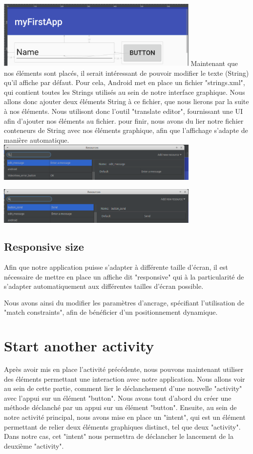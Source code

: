 \documentclass[french,a4paper,12pt]{report}
\begin{document}
\includegraphics[width=10cm]{16.png}
\bigbreak
Maintenant que nos éléments sont placés, il serait intéressant de pouvoir modifier
le texte (String) qu'il affiche par défaut. Pour cela, Android met en place un
fichier "strings.xml", qui contient toutes les Strings utilisés au sein de notre
interface graphique. Nous allons donc ajouter deux éléments String à ce fichier,
que nous lierons par la suite à nos éléments.
\smallbreak
Nous utilisont donc l'outil "translate editor", fournissant une UI afin d'ajouter
nos éléments au fichier.
\bigbreak
pour finir, nous avons du lier notre fichier conteneurs de String avec nos
éléments graphique, afin que l'affichage s'adapte de manière automatique.
\bigbreak
\includegraphics[width=10cm]{19.png}

\includegraphics[width=10cm]{20.png}

\subsection{Responsive size}
Afin que notre application puisse s'adapter à différente taille d'écran, il est
nécessaire de mettre en place un affiche dit "responsive" qui à la particularité
de s'adapter automatiquement aux différentes tailles d'écran possible.

Nous avons ainsi du modifier les paramètres d'ancrage, spécifiant l'utilisation
de "match constraints", afin de bénéficier d'un positionnement dynamique.

\section{Start another activity}
Après avoir mis en place l'activité précédente, nous pouvons maintenant utiliser
des éléments permettant une interaction avec notre application. Nous allons voir
au sein de cette partie, comment lier le déclanchement d'une nouvelle "activity" avec
l'appui sur un élément "button".
\bigbreak
Nous avons tout d'abord du créer une méthode déclanché par un appui sur un
élément "button".
\bigbreak
 Ensuite, au sein de notre activité principal, nous avons mise en place un "intent",
 qui est un élément permettant de relier deux éléments graphiques distinct, tel
 que deux "activity". Dans notre cas, cet "intent" nous permettra de déclancher
 le lancement de la deuxième "activity".
 \bigbreak
\end{document}
